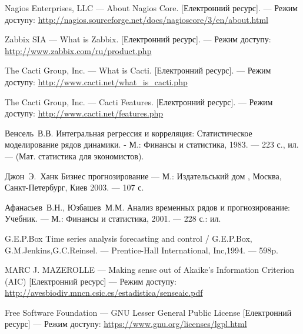 \documentclass{thesis_utf8}
\begin{document}
\begin{thebibliography}

    Nagios Enterprises, LLC --- About Nagios Core. [Електронний ресурс]. --- Режим доступу:
    \url{http://nagios.sourceforge.net/docs/nagioscore/3/en/about.html}

    Zabbix SIA --- What is Zabbix. [Електронний ресурс]. --- Режим доступу:
    \url{http://www.zabbix.com/ru/product.php}

    The Cacti Group, Inc. --- What is Cacti. [Електронний ресурс]. --- Режим доступу:
    \url{http://www.cacti.net/what_is_cacti.php}

    The Cacti Group, Inc. --- Cacti Features. [Електронний ресурс]. --- Режим доступу:
    \url{http://www.cacti.net/features.php}

    Венсель~В.В. Интегральная регрессия и корреляция: Статистическое моделирование рядов динамики. - М.: Финансы и статистика, 1983. --- 223 с., ил. --- (Мат. статистика для экономистов).

    Джон~Э.~Ханк Бизнес прогнозирование --- М.: Издательський дом , Москва, Санкт-Петербург, Киев 2003. --- 107 с.

    Афанасьев~В.Н., Юзбашев~М.М.  Анализ временных рядов и прогнозирование: Учебник. --- М.: Финансы и статистика, 2001. --- 228 с.: ил.

    	G.E.P.Box Time series analysis forecasting and control / G.E.P.Box, G.M.Jenkins,G.C.Reinsel. --- Prentice-Hall International, Inc,1994. --- 598p.

    	MARC J. MAZEROLLE --- Making sense out of Akaike’s Information Criterion
    (AIC) [Електронний ресурс] --- Режим доступу:
    \url{http://avesbiodiv.mncn.csic.es/estadistica/senseaic.pdf}

     Free Software Foundation --- GNU Lesser General Public License [Електронний ресурс] --- Режим доступу:
    \url{https://www.gnu.org/licenses/lgpl.html}


\end{thebibliography}
\end{document}
